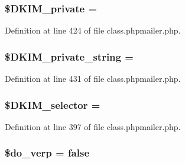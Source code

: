 \subsubsection[{\texorpdfstring{\$\+D\+K\+I\+M\+\_\+private}{$DKIM_private}}]{\setlength{\rightskip}{0pt plus 5cm}\$D\+K\+I\+M\+\_\+private = \textquotesingle{}\textquotesingle{}}\hypertarget{class_p_h_p_mailer_ac465c52f2f7ee6eade05ce0a65fbca61}{}\label{class_p_h_p_mailer_ac465c52f2f7ee6eade05ce0a65fbca61}


Definition at line 424 of file class.\+phpmailer.\+php.

\subsubsection[{\texorpdfstring{\$\+D\+K\+I\+M\+\_\+private\+\_\+string}{$DKIM_private_string}}]{\setlength{\rightskip}{0pt plus 5cm}\$D\+K\+I\+M\+\_\+private\+\_\+string = \textquotesingle{}\textquotesingle{}}\hypertarget{class_p_h_p_mailer_a8b211d29c0349751ae550f4084b69ea3}{}\label{class_p_h_p_mailer_a8b211d29c0349751ae550f4084b69ea3}


Definition at line 431 of file class.\+phpmailer.\+php.

\subsubsection[{\texorpdfstring{\$\+D\+K\+I\+M\+\_\+selector}{$DKIM_selector}}]{\setlength{\rightskip}{0pt plus 5cm}\$D\+K\+I\+M\+\_\+selector = \textquotesingle{}\textquotesingle{}}\hypertarget{class_p_h_p_mailer_ac21e5612fa66eeeee43467525e6c393d}{}\label{class_p_h_p_mailer_ac21e5612fa66eeeee43467525e6c393d}


Definition at line 397 of file class.\+phpmailer.\+php.

\subsubsection[{\texorpdfstring{\$do\+\_\+verp}{$do_verp}}]{\setlength{\rightskip}{0pt plus 5cm}\$do\+\_\+verp = false}\hypertarget{class_p_h_p_mailer_abf2ec34ae2e6abd0f598ea202a8fa807}{}\label{class_p_h_p_mailer_abf2ec34ae2e6abd0f598ea202a8fa807}


